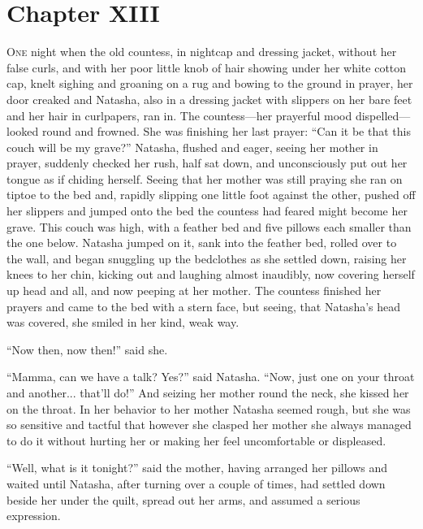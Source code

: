 \chapter*{Chapter XIII}
\ifaudio     
{} 
\fi

\lettrine[lines=2, loversize=0.3, lraise=0]{\initfamily O}{ne}
night when the old countess, in nightcap and dressing jacket,
without her false curls, and with her poor little knob of hair
showing under her white cotton cap, knelt sighing and groaning on
a rug and bowing to the ground in prayer, her door creaked and
Natasha, also in a dressing jacket with slippers on her bare feet
and her hair in curlpapers, ran in. The countess---her prayerful
mood dispelled---looked round and frowned. She was finishing her
last prayer: ``Can it be that this couch will be my grave?''
Natasha, flushed and eager, seeing her mother in prayer, suddenly
checked her rush, half sat down, and unconsciously put out her
tongue as if chiding herself. Seeing that her mother was still
praying she ran on tiptoe to the bed and, rapidly slipping one
little foot against the other, pushed off her slippers and jumped
onto the bed the countess had feared might become her grave. This
couch was high, with a feather bed and five pillows each smaller
than the one below. Natasha jumped on it, sank into the feather
bed, rolled over to the wall, and began snuggling up the
bedclothes as she settled down, raising her knees to her chin,
kicking out and laughing almost inaudibly, now covering herself
up head and all, and now peeping at her mother. The countess
finished her prayers and came to the bed with a stern face, but
seeing, that Natasha's head was covered, she smiled in her kind,
weak way.

``Now then, now then!'' said she.

``Mamma, can we have a talk? Yes?'' said Natasha. ``Now, just one
on your throat and another... that'll do!'' And seizing her
mother round the neck, she kissed her on the throat. In her
behavior to her mother Natasha seemed rough, but she was so
sensitive and tactful that however she clasped her mother she
always managed to do it without hurting her or making her feel
uncomfortable or displeased.

``Well, what is it tonight?'' said the mother, having arranged
her pillows and waited until Natasha, after turning over a couple
of times, had settled down beside her under the quilt, spread out
her arms, and assumed a serious expression.

